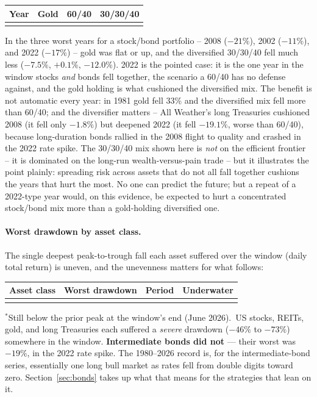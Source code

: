 \documentclass[11pt]{article}
\begin{document}
{\small
\begin{center}
\begin{tabular}{@{}rrrr@{}}
\toprule
Year & Gold & 60/40 & 30/30/40 \\
\midrule
\\
\bottomrule
\end{tabular}
\end{center}
}

In the three worst years for a stock/bond portfolio -- 2008 ($-21\%$), 2002 ($-11\%$), and 2022
($-17\%$) -- gold was flat or up, and the diversified 30/30/40 fell much less ($-7.5\%$, $+0.1\%$,
$-12.0\%$). 2022 is the pointed case: it is the one year in the window stocks \emph{and} bonds fell
together, the scenario a 60/40 has no defense against, and the gold holding is what cushioned the
diversified mix. The benefit is not automatic every year: in 1981 gold fell 33\% and the diversified
mix fell more than 60/40; and the diversifier matters -- All Weather's long Treasuries cushioned 2008
(it fell only $-1.8\%$) but deepened 2022 (it fell $-19.1\%$, worse than 60/40), because long-duration
bonds rallied in the 2008 flight to quality and crashed in the 2022 rate spike. The 30/30/40 mix shown
here is \emph{not} on the efficient frontier -- it is dominated on the long-run wealth-versus-pain trade
-- but it illustrates the point plainly: spreading risk across assets that do not all fall together
cushions the years that hurt the most. No one can predict the future; but a repeat of a 2022-type year
would, on this evidence, be expected to hurt a concentrated stock/bond mix more than a gold-holding
diversified one.

\paragraph{Worst drawdown by asset class.} The single deepest peak-to-trough fall each asset suffered
over the window (daily total return) is uneven, and the unevenness matters for what follows:

{\small
\begin{center}
\begin{tabular}{@{}lrcr@{}}
\toprule
Asset class & Worst drawdown & Period & Underwater \\
\midrule
\\
\bottomrule
\end{tabular}
\end{center}
}
\noindent\footnotesize $^{*}$Still below the prior peak at the window's end (June 2026).\normalsize\
US stocks, REITs, gold, and long Treasuries each suffered a \emph{severe} drawdown ($-46\%$ to $-73\%$)
somewhere in the window. \textbf{Intermediate bonds did not} --- their worst was $-19\%$, in the 2022
rate spike. The 1980--2026 record is, for the intermediate-bond series, essentially one long bull market
as rates fell from double digits toward zero. Section~\ref{sec:bonds} takes up what that means for the
strategies that lean on it.
\end{document}
